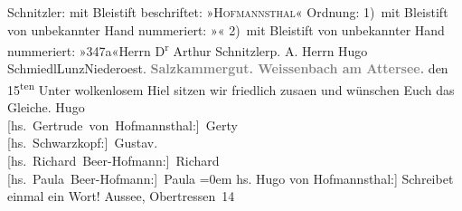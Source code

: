 \begin{ledgroupsized}[t]{13cm}
{\newline{}Schnitzler: mit Bleistift beschriftet: »\textsc{Hofmannsthal}« 
\newline{}Ordnung: 1) mit Bleistift von unbekannter Hand nummeriert: »«  2) mit Bleistift von unbekannter Hand nummeriert:
                                    »347a«}\pstart{}{\pb}Herrn D\textsuperscript{r} Arthur Schnitzler\pend{}\pstart{}p. A. Herrn Hugo Schmiedl\pend{}\pstart{}Lunz\pend{}\pstart{}Niederoest.\pend{}{\bigskip}\pstart
           \noindent{}\centering{}\textcolor{gray}{\textbf{{\pb}Salzkammergut. Weissenbach am Attersee.}}\pend
           \pstart
           \raggedleft{}{\pb}den 15\textsuperscript{ten}\pend
           \pstart
           Unter wolkenlosem Hi{\geminationm}el sitzen wir friedlich zusa{\geminationm}en und wünschen Euch das Gleiche.\pend
           \pstart
           \spacefill\mbox{Hugo}{\\[\baselineskip]}\spacefill\mbox{{[}hs. Gertrude von Hofmannsthal:{]} Gerty}{\\[\baselineskip]}\spacefill\mbox{{[}hs. Schwarzkopf:{]} Gustav.}{\\[\baselineskip]}\spacefill\mbox{{[}hs. Richard Beer-Hofmann:{]} Richard}{\\[\baselineskip]}\spacefill\mbox{{[}hs. Paula Beer-Hofmann:{]} Paula}\pend
           \leftskip=0em{}\pstart
           \noindent{}{[}hs. Hugo von Hofmannsthal:{]} Schreibet einmal ein Wort!\pend
           \pstart
           Aussee, Obertressen 14\pend
           
         
         \endnumbering{}\end{ledgroupsized}  \newcommand{\dateiname}{L02187}\newcommand{\titel}{Hugo von Hofmannsthal u. a. an Arthur Schnitzler, 15. [7. 1914]}\newcommand{\editorInnen}{Martin Anton Müller und Gerd-Hermann Susen}
      